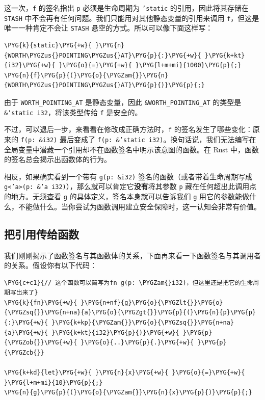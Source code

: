 这一次，\texttt{f} 的签名指出 \texttt{p} 必须是生命周期为 \texttt{'static} 的引用，因此将其存储在 \texttt{STASH} 中不会再有任何问题。我们只能用对其他静态变量的引用来调用 \texttt{f}，但这是唯一一种肯定不会让 \texttt{STASH} 悬空的方式。所以可以像下面这样写：

\begin{Verbatim}[commandchars=\\\{\},breaklines=true,breakanywhere=true,fontsize=\codefont,xleftmargin=17bp]
\PYG{k}{static}\PYG{+w}{ }\PYG{n}{WORTH\PYGZus{}POINTING\PYGZus{}AT}\PYG{p}{:}\PYG{+w}{ }\PYG{k+kt}{i32}\PYG{+w}{ }\PYG{o}{=}\PYG{+w}{ }\PYG{l+m+mi}{1000}\PYG{p}{;}
\PYG{n}{f}\PYG{p}{(}\PYG{o}{\PYGZam{}}\PYG{n}{WORTH\PYGZus{}POINTING\PYGZus{}AT}\PYG{p}{)}\PYG{p}{;}
\end{Verbatim}

由于 \texttt{WORTH\_POINTING\_AT} 是静态变量，因此 \texttt{\&WORTH\_POINTING\_AT} 的类型是 \texttt{\&'static i32}，将该类型传给 \texttt{f} 是安全的。

不过，可以退后一步，来看看在修改成正确方法时，\texttt{f} 的签名发生了哪些变化：原来的 \texttt{f(p: \&i32)} 最后变成了 \texttt{f(p: \&'static i32)}。换句话说，我们无法编写在全局变量中潜藏一个引用却不在函数签名中明示该意图的函数。在 Rust 中，函数的签名总会揭示出函数体的行为。

相反，如果确实看到一个带有 \texttt{g(p: \&i32)} 签名的函数（或者带着生命周期写成 \texttt{g<'a>(p: \&'a i32)}），那么就可以肯定它\textbf{没有}将其参数 \texttt{p} 藏在任何超出此调用点的地方。无须查看 \texttt{g} 的具体定义，签名本身就可以告诉我们 \texttt{g} 用它的参数能做什么，不能做什么。当你尝试为函数调用建立安全保障时，这一认知会非常有价值。

\subsection{把引用传给函数}

我们刚刚揭示了函数签名与其函数体的关系，下面再来看一下函数签名与其调用者的关系。假设你有以下代码：

\begin{Verbatim}[commandchars=\\\{\},breaklines=true,breakanywhere=true,fontsize=\codefont,xleftmargin=17bp]
\PYG{c+c1}{// 这个函数可以简写为fn g(p: \PYGZam{}i32)，但这里还是把它的生命周期写出来了}
\PYG{k}{fn}\PYG{+w}{ }\PYG{n+nf}{g}\PYG{o}{\PYGZlt{}}\PYG{o}{\PYGZsq{}}\PYG{n+na}{a}\PYG{o}{\PYGZgt{}}\PYG{p}{(}\PYG{n}{p}\PYG{p}{:}\PYG{+w}{ }\PYG{k+kp}{\PYGZam{}}\PYG{o}{\PYGZsq{}}\PYG{n+na}{a}\PYG{+w}{ }\PYG{k+kt}{i32}\PYG{p}{)}\PYG{+w}{ }\PYG{p}{\PYGZob{}}\PYG{+w}{ }\PYG{o}{..}\PYG{p}{.}\PYG{+w}{ }\PYG{p}{\PYGZcb{}}

\PYG{k+kd}{let}\PYG{+w}{ }\PYG{n}{x}\PYG{+w}{ }\PYG{o}{=}\PYG{+w}{ }\PYG{l+m+mi}{10}\PYG{p}{;}
\PYG{n}{g}\PYG{p}{(}\PYG{o}{\PYGZam{}}\PYG{n}{x}\PYG{p}{)}\PYG{p}{;}
\end{Verbatim}

